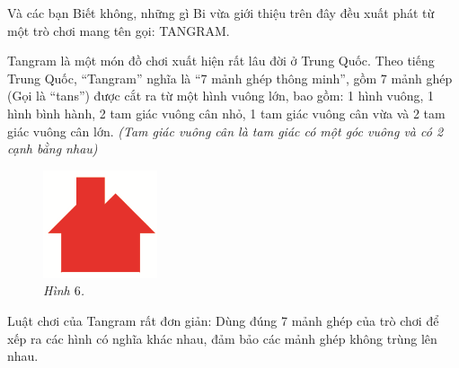 	Và các bạn Biết không, những gì Bi vừa giới thiệu trên đây đều xuất phát từ một trò chơi mang tên gọi: TANGRAM.
	\begin{multicols}{2}
		Tangram là một món đồ chơi xuất hiện rất lâu đời ở Trung Quốc. Theo tiếng Trung Quốc, “Tangram” nghĩa là “7 mảnh ghép thông minh”, gồm 7 mảnh ghép (Gọi là “tans”) được cắt ra từ một hình vuông lớn, bao gồm: 1 hình vuông, 1 hình bình hành, 2 tam giác vuông cân nhỏ, 1 tam giác vuông cân vừa và 2 tam giác vuông cân lớn.
		\vskip 0.1cm
		\textit{\small (Tam giác vuông cân là tam giác có một góc vuông và có 2 cạnh bằng nhau)}
		\begin{figure}[H]
			\vspace*{-15pt}	
			\captionsetup{labelformat=empty}
			\centering
			\captionsetup{justification=raggedleft}
			\includegraphics[width =0.3\textwidth]{image6}
			\caption{\small\it Hình $6$.}
		\end{figure}
	\end{multicols}
	Luật chơi của Tangram rất đơn giản: Dùng đúng 7 mảnh ghép của trò chơi để xếp ra các hình có nghĩa khác nhau, đảm bảo các mảnh ghép không trùng lên nhau.
	\vspace*{-5pt}
